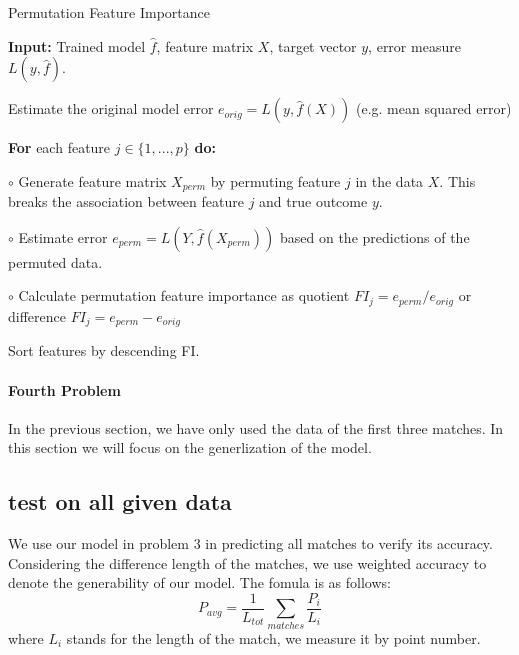 \documentclass[12pt, a4paper, oneside]{article}
\theoremstyle{break}
\begin{document}
\begin{algorithm}  
    \caption{Permutation Feature Importance}  
    \textbf{Input:} Trained model $\hat{f}$, feature matrix $X$, target vector $y$, error measure $L(y, \hat{f})$.  
      
    Estimate the original model error $e_{orig} = L(y, \hat{f}(X))$ (e.g. mean squared error)  
      
    \textbf{For} each feature $j \in \{1, ..., p\}$ \textbf{do:}  
      
    \quad\quad $\circ$ Generate feature matrix $X_{perm}$ by permuting feature $j$ in the data $X$. This breaks the association between feature $j$ and true outcome $y$.  
      
    \quad\quad $\circ$ Estimate error $e_{perm} = L(Y, \hat{f}(X_{perm}))$ based on the predictions of the permuted data.  
      
    \quad\quad $\circ$ Calculate permutation feature importance as quotient $FI_j = e_{perm} / e_{orig}$ or difference $FI_j = e_{perm} - e_{orig}$  
      
    Sort features by descending FI.
\end{algorithm}  







\paragraph{Fourth Problem}
In the previous section, we have only used the data of the first three matches. In this section we will focus on the generlization of the model.

\subsection{test on all given data}

We use our model in problem 3 in predicting all matches to verify its accuracy. Considering the difference length of the matches, we use weighted
accuracy to denote the generability of our model. The fomula is as follows:
$$ P_{avg}=\frac{1}{L_{tot}}\sum\limits_{matches}\frac{P_i}{L_i}$$
where $L_i$ stands for the length of the match, we measure it by point number.
\end{document}
